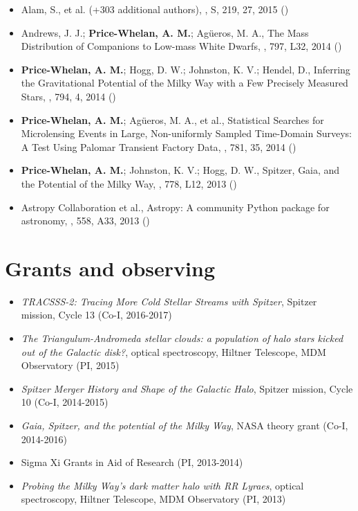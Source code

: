 \documentclass[12pt,letterpaper]{article}
\begin{document}
\begin{itemize}
\item Alam, S., et al. (+303 additional authors),
    ,
    \apj S, 219, 27, 2015 ()

\item Andrews, J. J.; {\bf Price-Whelan, A. M.}; Ag\"ueros, M. A.,
    {The Mass Distribution of Companions to Low-mass White Dwarfs},
    \apjl, 797, L32, 2014 ()

\item {\bf Price-Whelan, A. M.}; Hogg, D. W.; Johnston, K. V.; Hendel, D.,
    {Inferring the Gravitational Potential of the Milky Way with a Few Precisely Measured Stars},
    \apj, 794, 4, 2014 ()

\item {\bf Price-Whelan, A. M.}; Ag\"ueros, M. A., et al.,
    {Statistical Searches for Microlensing Events in Large, Non-uniformly Sampled Time-Domain Surveys: A Test Using Palomar Transient Factory Data},
    \apj, 781, 35, 2014 ()

\item {\bf Price-Whelan, A. M.}; Johnston, K. V.; Hogg, D. W.,
    {Spitzer, Gaia, and the Potential of the Milky Way},
    \apjl, 778, L12, 2013 ()

\item Astropy Collaboration et al.,
    {Astropy: A community Python package for astronomy},
    \aanda, 558, A33, 2013 ()

	\end{itemize}

\section*{Grants and observing }

	\begin{itemize}
    \item {\it TRACSSS-2: Tracing More Cold Stellar Streams with Spitzer}, Spitzer mission, Cycle 13 (Co-I, 2016-2017)
	\item {\it The Triangulum-Andromeda stellar clouds: a population of halo stars kicked out of the Galactic disk?}, optical spectroscopy, Hiltner Telescope, MDM Observatory (PI, 2015)
	\item {\it Spitzer Merger History and Shape of the Galactic Halo}, Spitzer mission, Cycle 10 (Co-I, 2014-2015)
	\item {\it Gaia, Spitzer, and the potential of the Milky Way}, NASA theory grant (Co-I, 2014-2016)
	\item Sigma Xi Grants in Aid of Research (PI, 2013-2014)
	\item {\it Probing the Milky Way's dark matter halo with RR Lyraes}, optical spectroscopy, Hiltner Telescope, MDM Observatory (PI, 2013)
	\end{itemize}
\end{document}
